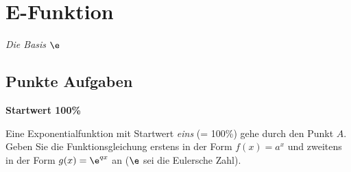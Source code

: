 

\section{E-Funktion}
\textit{Die Basis $\e$}

\subsection{Punkte Aufgaben}



\bbwActAufgabenNr{} \textbf{Startwert 100\%}


Eine Exponentialfunktion mit Startwert \textit{eins} (= 100\%) gehe durch den Punkt $A$. Geben Sie
die Funktionsgleichung erstens in der Form $f(x)=a^x$ und
zweitens in der Form $g(x)=\e^{qx}$ an ($\e$ sei die Eulersche Zahl).


